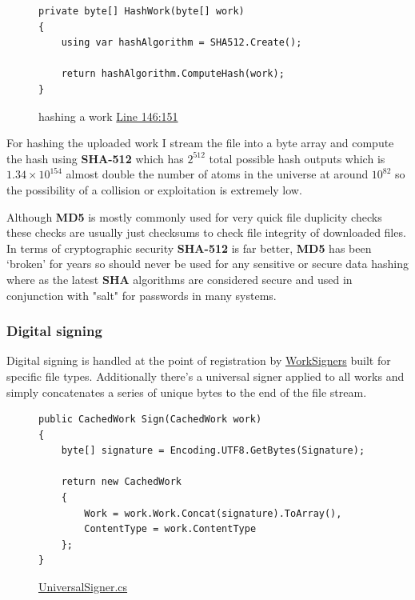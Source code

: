 \begin{figure}[H]
\caption{hashing a work \href{https://github.com/MrHarrisonBarker/CRPL/blob/main/CRPL.Web/Services/WorksVerificationService.cs}{Line 146:151}}
\centering
\begin{lstlisting}[language=CSharp]
private byte[] HashWork(byte[] work)
{
	using var hashAlgorithm = SHA512.Create();

	return hashAlgorithm.ComputeHash(work);
}
\end{lstlisting}
\end{figure}

For hashing the uploaded work I stream the file into a byte array and compute the hash using \textbf{SHA-512} which has \(2^{512}\) total possible hash outputs which is \(1.34 \times 10^{154}\) almost double the number of atoms in the universe at around \(10^{82}\) so the possibility of a collision or exploitation is extremely low. 

Although \textbf{MD5} is mostly commonly used for very quick file duplicity checks these checks are usually just checksums to check file integrity of downloaded files. In terms of cryptographic security \textbf{SHA-512} is far better, \textbf{MD5} has been `broken' for years so should never be used for any sensitive or secure data hashing where as the latest \textbf{SHA} algorithms are considered secure and used in conjunction with "salt" for passwords in many systems.

\subsubsection{Digital signing}

Digital signing is handled at the point of registration by \href{https://github.com/MrHarrisonBarker/CRPL/tree/main/CRPL.Web/Core/WorkSigners}{WorkSigners} built for specific file types. Additionally there's a universal signer applied to all works and simply concatenates a series of unique bytes to the end of the file stream.

\begin{figure}[H]
\caption{\href{https://github.com/MrHarrisonBarker/CRPL/blob/main/CRPL.Web/Core/WorkSigners/UniversalSigner.cs}{UniversalSigner.cs}}
\centering
\begin{lstlisting}[language=CSharp]
public CachedWork Sign(CachedWork work)
{
	byte[] signature = Encoding.UTF8.GetBytes(Signature);

	return new CachedWork
	{
		Work = work.Work.Concat(signature).ToArray(),
		ContentType = work.ContentType
	};
}
\end{lstlisting}
\end{figure}

